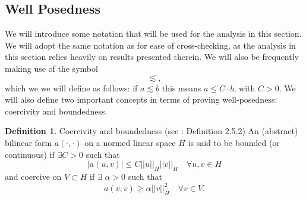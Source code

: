 \documentclass[12pt,a4paper]{article}
\theoremstyle{definition}
\newtheorem{definition}{Definition}[section]
\begin{document}
\subsection{Well Posedness}\label{sec_wellposed}
We will introduce some notation that will be used for the analysis in this section.  We will adopt the same notation as \cite{Chen2016} for ease of cross-checking, as the analysis in this section relies heavily on results presented therein. 
We will also be frequently making use of the symbol
\begin{equation}
	\lesssim \nonumber,
\end{equation}
which we we will define as follows: if $a\lesssim b$ this means $a\leq C\cdot b$, with $C>0$.  We will also define two important concepts in terms of proving well-posedness: coercivity and boundedness.
\theoremstyle{definition}
\begin{definition}{Coercivity and boundedness} (see \cite{brenner2007mathematical}: Definition 2.5.2)
	An (abstract) bilinear form $a\left(\cdot,\cdot\right)$ on a normed linear space $H$ is said  to be bounded (or continuous) if $\exists C > 0$ such that
	\begin{equation}
		\left|a\left(u,v\right)\right|\leq C \left|\left|u\right|\right|_H\left|\left|v\right|\right|_H \quad \forall u,v \in H\nonumber
	\end{equation}
	and coercive on $V\subset H$ if $\exists$ $\alpha > 0$ such that
	\begin{equation}
	a\left(v,v\right)\geq \alpha \left|\left|v\right|\right|_H^2\quad \forall v \in V\nonumber.
	\end{equation}
\end{definition}
\end{document}
